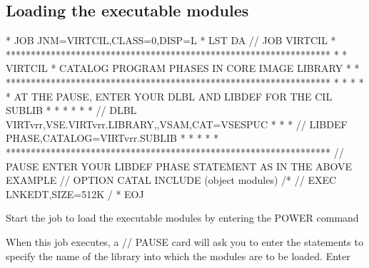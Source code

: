 \documentclass[letterpaper,10pt,english]{sphinxmanual}
\begin{document}
\subsection{Loading the executable modules}
\label{\detokenize{Installation_Guide:loading-the-executable-modules}}
\begin{sphinxVerbatim}[commandchars=\\\{\}]
* \PYGZdl{}\PYGZdl{} JOB JNM=VIRTCIL,CLASS=0,DISP=L
* \PYGZdl{}\PYGZdl{} LST DA
// JOB VIRTCIL
* *****************************************************************
* * VIRTCIL * CATALOG PROGRAM PHASES IN CORE IMAGE LIBRARY        *
* *****************************************************************
* *                                                               *
* * AT THE PAUSE, ENTER YOUR DLBL AND LIBDEF FOR THE CIL SUBLIB   *
* *                                                               *
* * // DLBL VIRTvrr,\PYGZsq{}VSE.VIRTvrr.LIBRARY\PYGZsq{},,VSAM,CAT=VSESPUC       *
* * // LIBDEF PHASE,CATALOG=VIRTvrr.SUBLIB                        *
* *                                                               *
* *****************************************************************
// PAUSE ENTER YOUR LIBDEF PHASE STATEMENT AS IN THE ABOVE EXAMPLE
// OPTION CATAL
        INCLUDE
        (object modules)
/*
// EXEC LNKEDT,SIZE=512K
/\PYGZam{}
* \PYGZdl{}\PYGZdl{} EOJ
\end{sphinxVerbatim}


Start the job to load the executable modules by entering the POWER command

\begin{sphinxVerbatim}[commandchars=\\\{\}]
 
\end{sphinxVerbatim}

When this job executes, a // PAUSE card will ask you to enter the statements to specify the name of the library into which the modules are to be loaded. Enter

\begin{sphinxVerbatim}[commandchars=\\\{\}]
  
  
\end{sphinxVerbatim}
\end{document}
